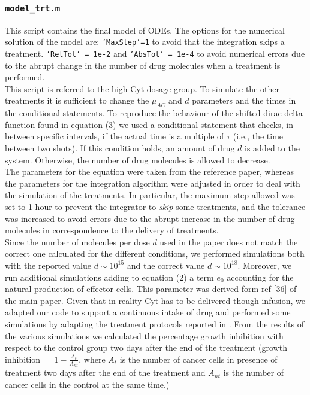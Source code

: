 \subsubsection{\texttt{model\_trt.m}}
This script contains the final model of ODEs. The options for the numerical solution of the model are: \texttt{'MaxStep'=1} to avoid that the integration skips a treatment. \texttt{'RelTol' = 1e-2} and \texttt{'AbsTol' = 1e-4} to avoid numerical errors due to the abrupt change in the number of drug molecules when a treatment is performed.\\
This script is referred to the high Cyt dosage group. To simulate the other treatments it is sufficient to change the $\mu_{AC}$ and $d$ parameters and the times in the conditional statements.
To reproduce the behaviour of the shifted dirac-delta function found in equation (3) we used a conditional statement that checks, in between specific intervals, if the actual time is a multiple of $\tau$ (i.e., the time between two shots). If this condition holds, an amount of drug $d$ is added to the system. Otherwise, the number of drug molecules is allowed to decrease.\\
The parameters for the equation were taken from the reference paper, whereas the parameters for the integration algorithm were adjusted in order to deal with the simulation of the treatments. In particular, the maximum step allowed was set to 1 hour to prevent the integrator to \textit{skip} some treatments, and the tolerance was increased to avoid errors due to the abrupt increase in the number of drug molecules in correspondence to the delivery of treatments.\\
Since the number of molecules per dose $d$ used in the paper does not match the correct one calculated for the different conditions, we performed simulations both with the reported value $d \sim 10^{15}$ and the correct value $d \sim 10^{18}$. Moreover, we run additional simulations adding to equation (2) a term $e_0$ accounting for the natural production of effector cells. This parameter was derived form ref [36] of the main paper.
Given that in reality Cyt has to be delivered though infusion, we adapted our code to support a continuous intake of drug and performed some simulations by adapting the treatment protocols reported in \cite{cyt-3}.
From the results of the various simulations we calculated the percentage growth inhibition with respect to the control group two days after the end of the treatment (growth inhibition $= 1 - \frac{A_t}{A_{nt}}$, where $A_t$ is the number of cancer cells in presence of treatment two days after the end of the treatment and $A_{nt}$ is the number of cancer cells in the control at the same time.)

